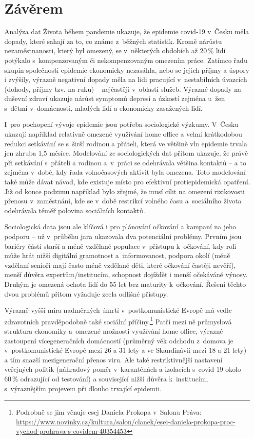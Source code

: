 \section*{Závěrem}

Analýza dat Života během pandemie ukazuje, že epidemie covid-19 v Česku měla dopady, které sahají za to, co známe z běžných statistik. Kromě nárůstu ne\-za\-měst\-na\-nos\-ti, který byl omezený, se v některých obdobích až 20\,\% lidí potýkalo s kompenzovaným či nekompenzovaným omezením práce. Zatímco řadu skupin společnosti epidemie ekonomicky nezasáhla, nebo se jejich příjmy a úspory i zvýšily, výrazně negativní dopady měla na lidi pracující v nestabilních úvazcích (dohody, příjmy tzv. na ruku) – nejčastěji v oblasti služeb. Výrazné dopady na duševní zdraví ukazuje nárůst symptomů depresí a úzkostí zejména u~žen s dětmi v domácnosti, mladých lidí a ekonomicky zasažených lidí.

I~pro pochopení vývoje epidemie jsou potřeba sociologické výzkumy. V Česku ukazují například relativně omezené využívání home office a velmi krátkodobou redukci setkávání se s širší rodinou a přáteli, která ve většině vln epidemie trvala jen zhruba 1,5 měsíce. Modelování ze sociologických dat přitom ukazuje, že právě při setkávání s přáteli a rodinou a v práci se odehrávala většina kontaktů – a to zejména v době, kdy řada volnočasových aktivit byla omezena. Toto modelování také může dávat návod, kde existuje místo pro efektivní protiepidemická opatření. Již od konce podzimu například bylo zřejmé, že musí cílit na omezení rizikovosti přenosu v zaměstnání, kde se v době restrikcí volného času a sociálního života odehrávala téměř polovina sociálních kontaktů.

Sociologická data jsou ale klíčová i pro plánování očkování a kampaní na jeho podporu – už v průběhu jara ukazovala dva potenciální problémy. Prvním jsou bariéry části starší a méně vzdělané populace v přístupu k očkování, kdy roli může hrát nižší digitální gramotnost a informovanost, podpora okolí (méně vzdělaní senioři mají často méně vzdělané děti, které očkování častěji nevěří), menší důvěra expertům/institucím, schopnost dojíždět i menší očekáváné výnosy. Druhým je omezená ochota lidí do 55 let bez maturity k očkování. Řešení těchto dvou problémů přitom vyžaduje zcela odlišné přístupy.

Výrazně vyšší míra nadměrných úmrtí v postkomunistické Evropě má vedle zdravotních pravděpodobně také sociální příčiny.\footnote{Podrobně se jim věnuje esej Daniela Prokopa v~Salonu Práva: \url{https://www.novinky.cz/kultura/salon/clanek/esej-daniela-prokopa-proc-vychod-prohrava-s-covidem-40354453}} Patří mezi ně průmyslová struktura ekonomiky a omezené možnosti využívání home office, výrazné zastoupení vícegeneračních domácností (průměrný věk odchodu z domova je v postkomunistické Evropě mezi 26 a 31 lety a ve Skandinávii mezi 18 a 21 lety) a tím snazší mezigenerační přenos viru. Ale také restriktivnější nastavení veřejných politik (náhradový poměr v karanténách a izolacích s covid-19 okolo 60\,\% odrazující od testování) a související nižší důvěra k~institucím, s~výraznějším projevem při dlouho trvající epidemii.

